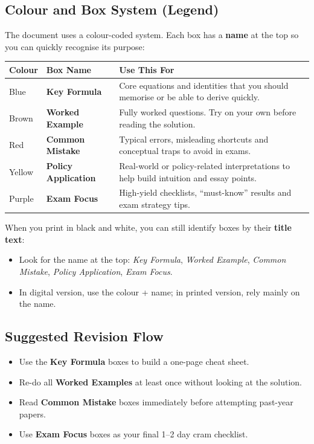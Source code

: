 \documentclass[12pt]{article}
\begin{document}
\subsection*{Colour and Box System (Legend)}

The document uses a colour-coded system. Each box has a \textbf{name} at the top so you can quickly recognise its purpose:

\begin{center}
\begin{tabular}{|l|l|p{7cm}|}
\hline
\textbf{Colour} & \textbf{Box Name} & \textbf{Use This For} \\
\hline
\colorbox{blue!5}{Blue}   & \textbf{Key Formula}      & Core equations and identities that you should memorise or be able to derive quickly. \\
\hline
\colorbox{brown!5}{Brown} & \textbf{Worked Example}   & Fully worked questions. Try on your own before reading the solution. \\
\hline
\colorbox{red!5}{Red}     & \textbf{Common Mistake}   & Typical errors, misleading shortcuts and conceptual traps to avoid in exams. \\
\hline
\colorbox{yellow!10}{Yellow} & \textbf{Policy Application} & Real-world or policy-related interpretations to help build intuition and essay points. \\
\hline
\colorbox{purple!5}{Purple} & \textbf{Exam Focus}      & High-yield checklists, ``must-know'' results and exam strategy tips. \\
\hline
\end{tabular}
\end{center}

\noindent
When you print in black and white, you can still identify boxes by their \textbf{title text}:
\begin{itemize}
    \item Look for the name at the top: \textit{Key Formula}, \textit{Worked Example}, \textit{Common Mistake}, \textit{Policy Application}, \textit{Exam Focus}.
    \item In digital version, use the colour + name; in printed version, rely mainly on the name.
\end{itemize}

\subsection*{Suggested Revision Flow}

\begin{examtip}
\begin{itemize}
    \item Use the \textbf{Key Formula} boxes to build a one-page cheat sheet.
    \item Re-do all \textbf{Worked Examples} at least once without looking at the solution.
    \item Read \textbf{Common Mistake} boxes immediately before attempting past-year papers.
    \item Use \textbf{Exam Focus} boxes as your final 1--2 day cram checklist.
\end{itemize}
\end{examtip}
\end{document}
